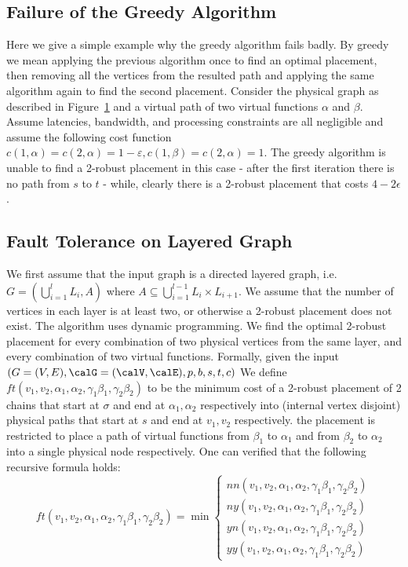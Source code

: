 \subsection{Failure of the Greedy Algorithm}
Here we give a simple example why the greedy algorithm fails badly.
By greedy we mean applying the previous algorithm once to find an optimal placement, 
then removing all the vertices from the resulted path and applying the same algorithm again
to find the second placement.
Consider the physical graph as described in Figure~\ref{fig:greedy-bad} and a virtual path of
two virtual functions $\alpha$ and $\beta$.
Assume latencies, bandwidth, and processing constraints are all negligible 
and assume the following cost function 
$c(1, \alpha) = c(2, \alpha) = 1-\varepsilon, c(1, \beta) = c(2, \alpha) = 1$.
The greedy algorithm is unable to find a 2-robust placement in this case - after the 
first iteration there is no path from $s$ to $t$ - while, clearly there is a 2-robust
placement that costs $4 - 2 \epsilon$.   
\begin{figure}
\caption{
\label{fig:greedy-bad}
}
\begin{center}
\end{center}
\end{figure}

  
\subsection{Fault Tolerance on Layered Graph}
We first assume that the input graph is a directed layered graph, i.e.
$G = (\bigcup_{i = 1}^l L_i, A)$ where 
$A \subseteq \bigcup_{i = 1}^{l - 1} L_i \times L_{i+1}$.
We assume that the number of vertices in each layer is at least two, or otherwise a 2-robust 
placement does not exist.
The algorithm uses dynamic programming.
We find the optimal 2-robust placement for every  
combination of two physical vertices from the same layer, 
and every combination of two virtual functions.
Formally, given the input $(G = (V, E), \calG = (\calV, \calE), p, b, s, t, c)$
We define $ft(v_1, v_2, \alpha_1, \alpha_2, \gamma_1\beta_1, \gamma_2\beta_2)$ 
to be the minimum cost of a 2-robust placement of 2 chains
that start at $\sigma$ and end at $\alpha_1, \alpha_2$ respectively into 
(internal vertex disjoint) physical paths that start at $s$ and end at $v_1,v_2$ respectively.
the placement is restricted to place a path of virtual functions from $\beta_1$ to
$\alpha_1$ and from $\beta_2$ to $\alpha_2$ into a single physical node respectively.
One can verified that the following recursive formula holds:
$$
ft(v_1, v_2, \alpha_1, \alpha_2, \gamma_1\beta_1, \gamma_2\beta_2) = \min
\begin{cases}
nn(v_1, v_2, \alpha_1, \alpha_2, \gamma_1\beta_1, \gamma_2\beta_2)
\\
ny(v_1, v_2, \alpha_1, \alpha_2, \gamma_1\beta_1, \gamma_2\beta_2)
\\
yn(v_1, v_2, \alpha_1, \alpha_2, \gamma_1\beta_1, \gamma_2\beta_2)
\\
yy(v_1, v_2, \alpha_1, \alpha_2, \gamma_1\beta_1, \gamma_2\beta_2) 
\end{cases}
$$

